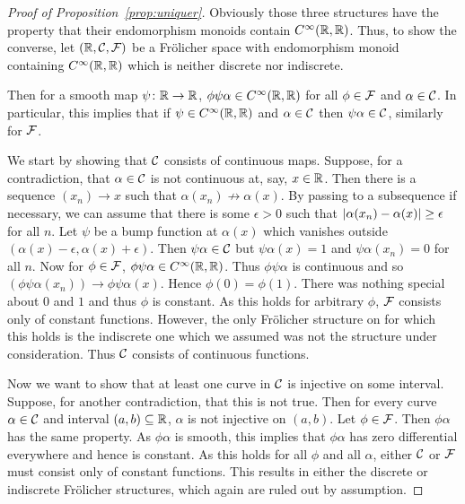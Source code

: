 \documentclass[%
12pt,%
arxiv,%
defaults
]{myclass}
\begin{document}
\begin{proof}[{Proof of Proposition~\ref{prop:uniquer}}]
Obviously those three structures have the property that their endomorphism monoids contain \(C^\infty(\mathbb{R},\mathbb{R})\).
Thus, to show the converse, let \((\mathbb{R}, \mathcal{C}, \mathcal{F})\) be a Fr\"olicher space with endomorphism monoid containing \(C^\infty(\mathbb{R},\mathbb{R})\) which is neither discrete nor indiscrete.

Then for a smooth map \(\psi \colon \mathbb{R} \to \mathbb{R}\), \(\phi \psi \alpha \in C^\infty(\mathbb{R},\mathbb{R})\) for all \(\phi \in \mathcal{F}\) and \(\alpha \in \mathcal{C}\).
In particular, this implies that if \(\psi \in C^\infty(\mathbb{R},\mathbb{R})\) and \(\alpha \in \mathcal{C}\) then \(\psi \alpha \in \mathcal{C}\), similarly for \(\mathcal{F}\).

We start by showing that \(\mathcal{C}\) consists of continuous maps.
Suppose, for a contradiction, that \(\alpha \in \mathcal{C}\) is not continuous at, say, \(x \in \mathbb{R}\).
Then there is a sequence \((x_n) \to x\) such that \(\alpha(x_n) \not\to \alpha(x)\).
By passing to a subsequence if necessary, we can assume that there is some \(\epsilon > 0\) such that \(\abs{\alpha(x_n) - \alpha(x)} \ge \epsilon\) for all \(n\).
Let \(\psi\) be a bump function at \(\alpha(x)\) which vanishes outside \((\alpha(x) - \epsilon, \alpha(x) + \epsilon)\).
Then \(\psi \alpha \in \mathcal{C}\) but \(\psi \alpha(x) = 1\) and \(\psi \alpha(x_n) = 0\) for all \(n\).
Now for \(\phi \in \mathcal{F}\), \(\phi \psi \alpha \in C^\infty(\mathbb{R},\mathbb{R})\).
Thus \(\phi \psi \alpha\) is continuous and so \((\phi \psi \alpha(x_n)) \to \phi \psi \alpha(x)\).
Hence \(\phi(0) = \phi(1)\).
There was nothing special about \(0\) and \(1\) and thus \(\phi\) is constant.
As this holds for arbitrary \(\phi\), \(\mathcal{F}\) consists only of constant functions.
However, the only Fr\"olicher structure on \R for which this holds is the indiscrete one which we assumed was not the structure under consideration.
Thus \(\mathcal{C}\) consists of continuous functions.

Now we want to show that at least one curve in \(\mathcal{C}\) is injective on some interval.
Suppose, for another contradiction, that this is not true.
Then for every curve \(\alpha \in \mathcal{C}\) and interval \((a,b) \subseteq \mathbb{R}\), \(\alpha\) is not injective on \((a,b)\).
Let \(\phi \in \mathcal{F}\).
Then \(\phi \alpha\) has the same property.
As \(\phi \alpha\) is smooth, this implies that \(\phi \alpha\) has zero differential everywhere and hence is constant.
As this holds for all \(\phi\) and all \(\alpha\), either \(\mathcal{C}\) or \(\mathcal{F}\) must consist only of constant functions.
This results in either the discrete or indiscrete Fr\"olicher structures, which again are ruled out by assumption.


\end{proof}
\end{document}
